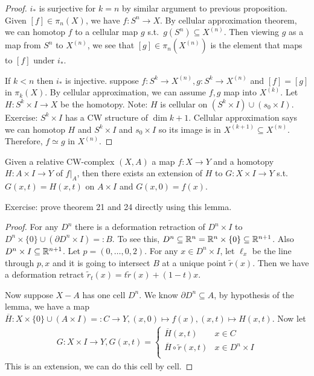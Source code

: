 \documentclass[12pt,class=article,crop=false]{standalone}
\begin{document}
\begin{proof}
	$ i_*$ is surjective for  $ k = n$ by similar argument to previous proposition. Given $ [f] \in \pi_n(X)$, we have $ f: S^{n} \to X$. By cellular approximation theorem, we can homotop $ f$ to a cellular map  $ g$  s.t.\ $ g(S^{n}) \subseteq X^{(n)}$. Then viewing  $ g$ as a map from  $ S^{n}$ to $ X^{(n)}$, we see that $ [g] \in \pi_n(X^{(n)})$ is the element that maps to $ [f]$ under $ i_*$. 

	If $ k<n$ then  $ i_*$ is injective. suppose  $ f: S^{k} \to X^{(n)}, g : S^{k} \to X^{(n)}$ and $ [f] = [g]$ in  $ \pi_k(X)$. By cellular approximation, we can assume $ f,g$ map into  $ X^{(k)}$. Let $ H:S^{k} \times I \to X$ be the homotopy. Note: $ H$ is cellular on  $ (S^{k} \times I) \cup (s_0 \times I)$. Exercise: $ S^{k} \times I$ has a CW structure of $ \dim k+1$. Cellular approximation says we can homotop  $ H$ and  $ S^{k} \times I$ and $ s_0 \times I$ so its image is in $ X^{(k+1)} \subseteq X^{(n)}$. Therefore, $ f \simeq g$ in $ X^{(n)}$.
\end{proof}

\begin{lem}
Given a relative CW-complex $ (X,A)$ a map  $ f: X \to Y$ and a homotopy $ H:A \times I \to Y$ of $ f|_A$, then there exists an extension of  $ H $ to $ G: X \times I \to Y$ s.t.\ $ G(x,t) = H(x,t)$ on  $ A \times I$ and $ G(x,0)=f(x)$.
\end{lem}
Exercise: prove theorem 21 and 24 directly using this lemma.

\begin{proof}
For any $ D^{n}$ there is a deformation retraction of $ D^{n} \times I $ to $ D^{n} \times \{0\} \cup (\partial D^{n} \times I)=:B$. To see this, $ D^{n} \subseteq \mathbb{R}^{n} = \mathbb{R}^{n} \times \{0\} \subseteq \mathbb{R}^{n+1} $. Also $ D^{n} \times I \subseteq \mathbb{R}^{n+1}$. Let $ p=(0,\ldots,0,2)$. For any $ x \in D^{n} \times I$, let $ \ell_x$ be the line through $ p,x$ and it is going to intersect $ B$ at a unique point $ \widetilde{ r}(x)$. Then we have a deformation retract $ \widetilde{ r}_t(x) = t \widetilde{ r}(x) + (1-t) x$.

Now suppose $ X-A$ has one cell  $ D^{n}$. We know $ \partial D^{n} \subseteq A$, by hypothesis of the lemma, we have a map $ \overline{H}: X \times \{0\}  \cup (A \times I)=:C \to Y, (x,0)\mapsto f(x),(x,t)\mapsto H(x,t)$. Now let
\begin{align*}
	G: X \times I \to Y, G(x,t) = \begin{cases}
		\overline{H}(x,t) & x \in C\\
		\overline{H} \circ \widetilde{ r}(x,t) & x \in D^{n} \times I\\
	\end{cases}
\end{align*}
This is an extension, we can do this cell by cell.
\end{proof}
\end{document}
